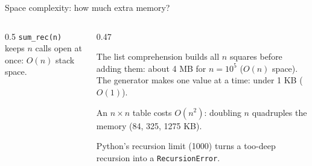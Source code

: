 \documentclass[aspectratio=169,10pt]{beamer}
\newcommand{\pyouts}[2]{}
\begin{document}
\begin{frame}{Space complexity: how much extra memory?}
\begin{columns}[T]
\begin{column}{0.5\textwidth}
\vspace{2mm}
\vspace{2mm}
{\small \texttt{sum\_rec(n)} keeps $n$ calls open at once: $O(n)$ stack space.}
\end{column}
\begin{column}{0.47\textwidth}
\pyouts{\fontsize{7.6}{9}}{space_demo}
\vspace{2mm}
{\small
The list comprehension builds all $n$ squares before adding them: about 4 MB for $n=10^5$ (\textbf{$O(n)$} space). The generator makes one value at a time: under 1 KB (\textbf{$O(1)$}).

\vspace{2mm}
An $n\times n$ table costs $O(n^2)$: doubling $n$ quadruples the memory (84, 325, 1275 KB).

\vspace{2mm}
Python's recursion limit (1000) turns a too-deep recursion into a \texttt{RecursionError}.}
\end{column}
\end{columns}
\end{frame}
\end{document}
